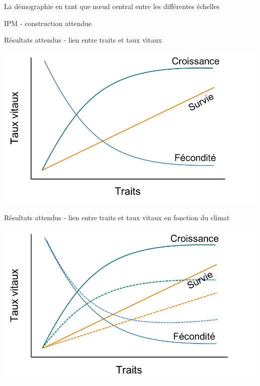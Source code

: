 \documentclass[11pt, compress, aspectratio=1610]{beamer}
\begin{document}
\begin{frame}{La démographie en tant que nœud central entre les
différentes échelles}
\begin{frame}{IPM - construction attendue}
\protect\hypertarget{ipm---construction-attendue}{}



\end{frame}

\begin{frame}{Résultats attendus - lien entre traits et taux vitaux}
\protect\hypertarget{ruxe9sultats-attendus---lien-entre-traits-et-taux-vitaux}{}

\centering

\includegraphics[scale=0.55]{figures/output_chap1.png}

\par

\end{frame}

\begin{frame}{Résultats attendus - lien entre traits et taux vitaux en
fonction du climat}
\protect\hypertarget{ruxe9sultats-attendus---lien-entre-traits-et-taux-vitaux-en-fonction-du-climat}{}

\centering

\includegraphics[scale=0.55]{figures/output_chap1a.png}


\end{frame}
\end{frame}
\end{document}
